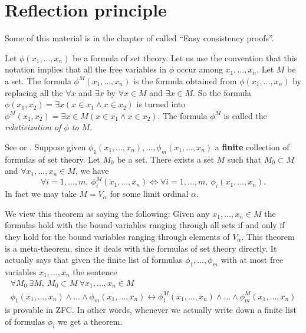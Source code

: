 \section{Reflection principle}
\label{section-reflection-principle}

\noindent
Some of this material is in the chapter of \cite{Kunen} called
``Easy consistency proofs''.

\medskip\noindent
Let $\phi(x_1,\ldots,x_n)$ be a formula of set theory.
Let us use the convention that this notation implies that
all the free variables in $\phi$ occur among $x_1, \ldots, x_n$.
Let $M$ be a set.
The formula $\phi^M(x_1, \ldots, x_n)$ is the
formula obtained from $\phi(x_1, \ldots, x_n)$ by replacing all the
$\forall x$ and $\exists x$ by $\forall x\in M$ and $\exists x\in M$.
So the formula
$\phi(x_1,x_2) = \exists x (x\in x_1 \wedge x\in x_2)$
is turned  into
$\phi^M(x_1,x_2) = \exists x \in M (x\in x_1 \wedge x\in x_2)$.
The formula $\phi^M$ is called the {\it relativization of $\phi$
to $M$}.

\begin{theorem}
\label{theorem-reflection-principle}
See \cite[Theorem 12.14]{Jech} or \cite[Theorem 7.4]{Kunen}.
Suppose given $\phi_1(x_1, \ldots, x_n), \ldots, \phi_m(x_1, \ldots, x_n)$
a {\bf finite} collection of
formulas of set theory. Let $M_0$ be a set.
There exists a set $M$ such that
$M_0 \subset M$ and
$\forall x_1, \ldots, x_n \in M$, we have
$$
\forall i = 1, \ldots, m,\  
\phi_i^{M}(x_1,\ldots,x_n)
\Leftrightarrow
\forall i = 1, \ldots, m,\  
\phi_i(x_1,\ldots,x_n).
$$
In fact we may take $M = V_\alpha$ for some limit ordinal $\alpha$.
\end{theorem}

\noindent
We view this theorem as saying the following: Given any
$x_1, \ldots, x_n \in M$ the formulas hold with the bound variables ranging
through all sets if and only if they hold for the bound variables ranging
through elements of $V_\alpha$. This theorem is a meta-theorem, since
it deals with the formulas of set theory directly.
It actually says that given the finite list of formulas
$\phi_1, \ldots, \phi_m$ with at most free variables $x_1, \ldots, x_n$
the sentence
$$
\begin{matrix}
\forall M_0\ \exists M,\ M_0 \subset M\ \forall x_1, \ldots, x_n \in M \\
\phi_1(x_1,\ldots,x_n) \wedge \ldots \wedge \phi_m(x_1,\ldots,x_n)
\leftrightarrow
\phi_1^M(x_1,\ldots,x_n) \wedge \ldots \wedge \phi_m^M(x_1,\ldots,x_n)
\end{matrix}
$$
is provable in ZFC. In other words, whenever we actually write down
a finite list of formulas $\phi_i$ we get a theorem.

